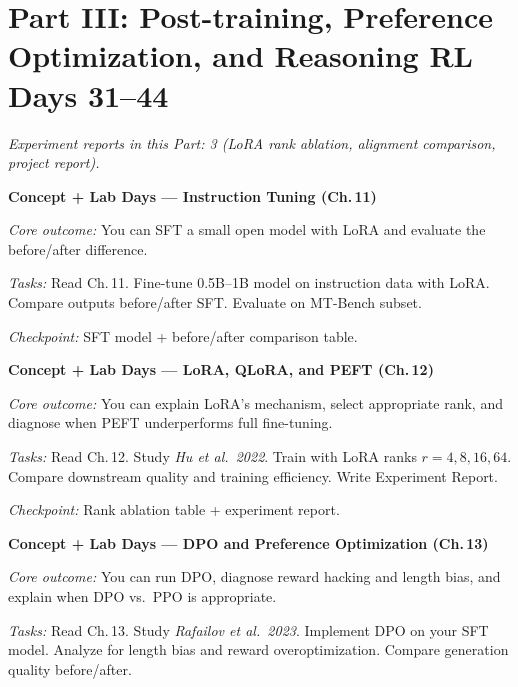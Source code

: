 \section*{Part III: Post-training, Preference Optimization, and Reasoning RL \hfill Days 31--44}

\medskip
\noindent\textit{Experiment reports in this Part: 3 (LoRA rank ablation, alignment comparison, project report).}

\begin{description}[style=nextline, leftmargin=1.8cm, labelwidth=1.5cm]

\item[Day 31--32] \textbf{Concept + Lab Days --- Instruction Tuning (Ch.\,11)}

\textit{Core outcome:} You can SFT a small open model with LoRA and evaluate the before/after difference.

\textit{Tasks:} Read Ch.\,11. Fine-tune 0.5B--1B model on instruction data with LoRA. Compare outputs before/after SFT. Evaluate on MT-Bench subset.

\textit{Checkpoint:} SFT model + before/after comparison table.

\item[Day 33--34] \textbf{Concept + Lab Days --- LoRA, QLoRA, and PEFT (Ch.\,12)}

\textit{Core outcome:} You can explain LoRA's mechanism, select appropriate rank, and diagnose when PEFT underperforms full fine-tuning.

\textit{Tasks:} Read Ch.\,12. Study \emph{Hu et al.\ 2022}. Train with LoRA ranks $r = 4, 8, 16, 64$. Compare downstream quality and training efficiency. Write Experiment Report.

\textit{Checkpoint:} Rank ablation table + experiment report.

\item[Day 35--37] \textbf{Concept + Lab Days --- DPO and Preference Optimization (Ch.\,13)}

\textit{Core outcome:} You can run DPO, diagnose reward hacking and length bias, and explain when DPO vs.\ PPO is appropriate.

\textit{Tasks:} Read Ch.\,13. Study \emph{Rafailov et al.\ 2023}. Implement DPO on your SFT model. Analyze for length bias and reward overoptimization. Compare generation quality before/after.


\end{description}
